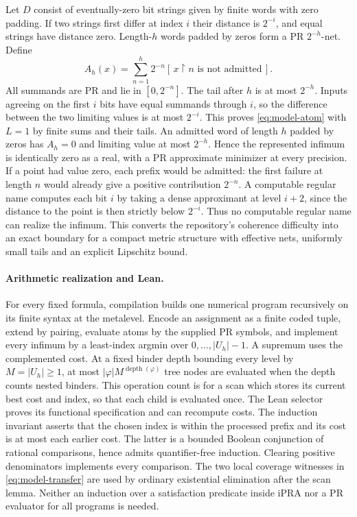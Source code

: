 Let $D$ consist of eventually-zero bit strings given by finite words with
zero padding. If two strings first differ at index $i$ their distance
is $2^{-i}$, and equal strings have distance zero. Length-$h$ words padded
by zeros form a PR $2^{-h}$-net. Define
\[
 A_h(x)=\sum_{n=1}^h 2^{-n}
       [\,x{\upharpoonright}n\text{ is not admitted}\,] .
\]
All summands are PR and lie in $[0,2^{-n}]$. The tail after $h$ is at
most $2^{-h}$. Inputs agreeing on the first $i$ bits have equal
summands through $i$, so the difference between the two limiting values
is at most $2^{-i}$. This proves \eqref{eq:model-atom} with $L=1$
by finite sums and their tails. An admitted word of length $h$ padded
by zeros has $A_h=0$ and limiting value at most $2^{-h}$. Hence the
represented infimum is identically zero as a real, with a PR approximate
minimizer at every precision. If a point had value zero, each prefix
would be admitted: the first failure at length $n$ would already give
a positive contribution $2^{-n}$. A computable regular name computes
each bit $i$ by taking a dense approximant at level $i+2$, since the
distance to the point is then strictly below $2^{-i}$. Thus no computable
regular name can realize the infimum. This converts the repository's
coherence difficulty into an exact boundary for a compact metric
structure with effective nets, uniformly small tails and an explicit
Lipschitz bound.

\paragraph{Arithmetic realization and Lean.}
For every fixed formula, compilation builds one numerical program
recursively on its finite syntax at the metalevel. Encode an assignment
as a finite coded tuple, extend by pairing, evaluate atoms by the supplied
PR symbols, and implement every infimum by a least-index argmin over
$0,\ldots,|U_h|-1$. A supremum uses the complemented cost.
At a fixed binder depth bounding every level by $M=|U_h|\ge1$, at most
$|\varphi|M^{\operatorname{depth}(\varphi)}$ tree nodes are evaluated
when the depth counts nested binders. This operation count is for a scan which stores its current best
cost and index, so that each child is evaluated once. The Lean
selector proves its functional specification and can recompute costs. The induction invariant asserts
that the chosen index is within the processed prefix and its cost is
at most each earlier cost. The latter is a bounded Boolean conjunction
of rational comparisons, hence admits quantifier-free induction. Clearing
positive denominators implements every comparison. The two local coverage
witnesses in \eqref{eq:model-transfer} are used by ordinary existential
elimination after the scan lemma. Neither an induction over a satisfaction
predicate inside iPRA nor a PR evaluator for all programs is needed.

